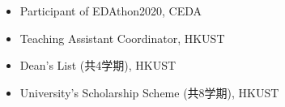 \documentclass{mycv}
\begin{document}
\begin{itemize}
  \item Participant of EDAthon2020, CEDA 
  \item Teaching Assistant Coordinator, HKUST 
  \item Dean's List (共4学期), HKUST
  \item University's Scholarship Scheme (共8学期), HKUST
\end{itemize}
%
%
%
%
\end{document}
